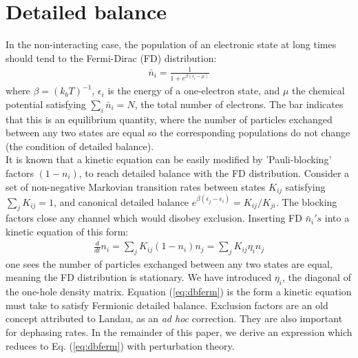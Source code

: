 \documentclass[aip,jcp,preprint,floatfix]{revtex4-1}
\begin{document}
{\section{Detailed balance}
\indent   In the non-interacting case, the population of an electronic state at long times should tend to the Fermi-Dirac (FD) distribution:
\begin{align}
\bar{n}_i = \frac{1}{1+e^{\beta(\epsilon_i-\mu)}}
\label{eq:db}
\end{align}
where $\beta = (k_bT)^{-1}$, $\epsilon_i$ is the energy of a one-electron state, and $\mu$ the chemical potential satisfying $\sum_i \bar{n}_i=N$, the total number of electrons. The bar indicates that this is an equilibrium quantity, where the number of particles exchanged between any two states are equal so the corresponding populations do not change (the condition of detailed balance). \\
\indent     It is known that a kinetic equation can be easily modified by 'Pauli-blocking' factors $(1-n_i)$, to reach detailed balance with the FD distribution. Consider a set of non-negative Markovian transition rates between states $K_{ij}$ satisfying $\sum_j K_{ij}=1$, and canonical detailed balance $e^{\beta(\epsilon_j-\epsilon_i)}=K_{ij}/K_{ji}$. The blocking factors close any channel which would disobey exclusion. Inserting FD $\bar{n}_i's$ into a kinetic equation of this form:
\begin{align}
    \frac{d}{dt} n_i = \sum_j K_{ij} (1-n_i) n_j = \sum_j K_{ij} \eta_i n_j
\label{eq:dbferm}
\end{align}
one sees the number of particles exchanged between any two states are equal, meaning the FD distribution is stationary. We have introduced $\eta_i$, the diagonal of the one-hole density matrix. Equation (\ref{eq:dbferm}) is the form a kinetic equation must take to satisfy Fermionic detailed balance. Exclusion factors are an old concept attributed to Landau\cite{landau}, as an \textit{ad hoc} correction. They are also important for dephasing rates\cite{imry}. In the remainder of this paper, we derive an expression which reduces to Eq. (\ref{eq:dbferm}) with perturbation theory. 

}
\end{document}
